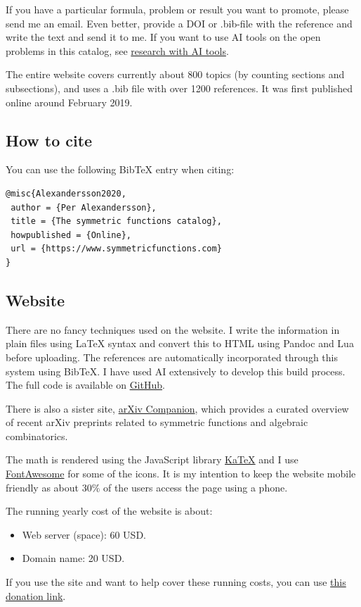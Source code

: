 If you have a particular formula, problem or result you want to promote, please send me an email.
Even better, provide a DOI or .bib-file with the reference and write the text and send it to me.
If you want to use AI tools on the open problems in this catalog, see
\hyperref[aiResearch]{research with AI tools}.

The entire website covers currently about 800 topics (by counting sections and subsections),
and uses a .bib file with over 1200 references. 
It was first published online around February 2019.


\subsection[howToCite]{How to cite}

You can use the following BibTeX entry when citing:
\begin{lstlisting}
@misc{Alexandersson2020,
 author = {Per Alexandersson},
 title = {The symmetric functions catalog},
 howpublished = {Online},
 url = {https://www.symmetricfunctions.com}
} 
\end{lstlisting}



\subsection[aboutWebpage]{Website}

There are no fancy techniques used on the website.
I write the information in plain files using LaTeX syntax and convert this
to HTML using Pandoc and Lua before uploading.
The references are automatically incorporated through this system using BibTeX.
I have used AI extensively to develop this build process.
The full code is available on \href{https://github.com/PerAlexandersson/symmetricfunctions.com}{ GitHub}.

There is also a sister site, \href{https://www.arxiv.symmetricfunctions.com}{arXiv Companion}, which provides a curated overview of recent arXiv preprints related to symmetric functions and algebraic combinatorics.

The math is rendered using the JavaScript library \href{https://katex.org//}{KaTeX}
and I use \href{https://fontawesome.com/}{FontAwesome} for some of the icons.
It is my intention to keep the website mobile friendly as 
about $30\%$ of the users access the page using a phone.



The running yearly cost of the website is about:
\begin{itemize}
 \item Web server (space): 60 USD.
 \item Domain name: 20 USD.
\end{itemize}

If you use the site and want to help cover these running costs, you can use
\href{https://ko-fi.com/W7W41VN3WK}{this donation link}.
